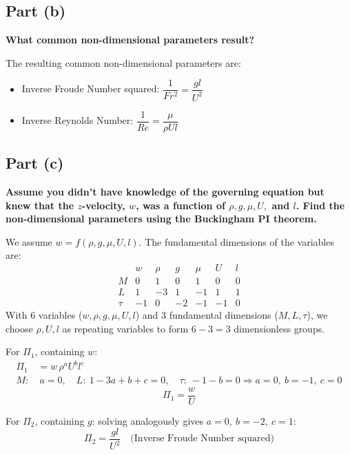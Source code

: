 \documentclass[12pt]{article}
\begin{document}
\subsection*{Part (b)}
\textbf{What common non-dimensional parameters result?}

The resulting common non-dimensional parameters are:
\begin{itemize}
    \item Inverse Froude Number squared: $\dfrac{1}{Fr^2} = \dfrac{g l}{U^2}$
    \item Inverse Reynolds Number: $\dfrac{1}{Re} = \dfrac{\mu}{\rho U l}$
\end{itemize}

\subsection*{Part (c)}
\textbf{Assume you didn't have knowledge of the governing equation but knew that the $z$-velocity, $w$, was a function of $\rho, g, \mu, U,$ and $l$. Find the non-dimensional parameters using the Buckingham PI theorem.}

We assume $w = f(\rho, g, \mu, U, l)$. The fundamental dimensions of the variables are:
\begin{equation*}
    \begin{array}{c|cccccc}
        & w & \rho & g & \mu & U & l \\
        \hline
        M & 0 & 1 & 0 & 1 & 0 & 0 \\
        L & 1 & -3 & 1 & -1 & 1 & 1 \\
        \tau & -1 & 0 & -2 & -1 & -1 & 0
    \end{array}
\end{equation*}
With 6 variables ($w, \rho, g, \mu, U, l$) and 3 fundamental dimensions ($M, L, \tau$), we choose $\rho, U, l$ as repeating variables to form $6 - 3 = 3$ dimensionless groups.

For $\Pi_1$, containing $w$:
\begin{align*}
    \Pi_1 &= w\, \rho^a U^b l^c \\
    M:&\ a = 0, \quad L:\ 1 - 3a + b + c = 0, \quad \tau:\ -1 - b = 0 \Rightarrow a = 0,\ b = -1,\ c = 0
\end{align*}
\begin{equation}
    \Pi_1 = \frac{w}{U}
\end{equation}

For $\Pi_2$, containing $g$: solving analogously gives $a = 0,\ b = -2,\ c = 1$:
\begin{equation}
    \Pi_2 = \frac{g l}{U^2} \quad \text{(Inverse Froude Number squared)}
\end{equation}
\end{document}
